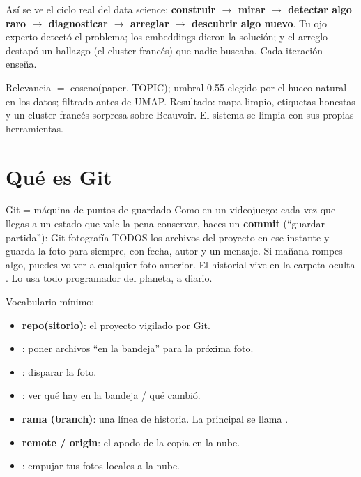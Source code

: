 \documentclass[11pt,a4paper]{article}
\begin{document}
\begin{ojo}
Así se ve el ciclo real del data science: \textbf{construir $\rightarrow$ mirar $\rightarrow$
detectar algo raro $\rightarrow$ diagnosticar $\rightarrow$ arreglar $\rightarrow$ descubrir
algo nuevo}. Tu ojo experto detectó el problema; los embeddings dieron la solución; y el
arreglo destapó un hallazgo (el cluster francés) que nadie buscaba. Cada iteración enseña.
\end{ojo}

\begin{resumen}
Relevancia $=$ coseno(paper, TOPIC); umbral 0.55 elegido por el hueco natural en los datos;
filtrado antes de UMAP. Resultado: mapa limpio, etiquetas honestas y un cluster francés
sorpresa sobre Beauvoir. El sistema se limpia con sus propias herramientas.
\end{resumen}
\clearpage
{}
{}

\section{Qué es Git}

\begin{concepto}{Git = máquina de puntos de guardado}
Como en un videojuego: cada vez que llegas a un estado que vale la pena conservar, haces un
\textbf{commit} (``guardar partida''): Git fotografía TODOS los archivos del proyecto en ese
instante y guarda la foto para siempre, con fecha, autor y un mensaje. Si mañana rompes algo,
puedes volver a cualquier foto anterior. El historial vive en la carpeta oculta .
Lo usa todo programador del planeta, a diario.
\end{concepto}

Vocabulario mínimo:
\begin{itemize}
  \item \textbf{repo(sitorio)}: el proyecto vigilado por Git.
  \item {}: poner archivos ``en la bandeja'' para la próxima foto.
  \item {}: disparar la foto.
  \item {}: ver qué hay en la bandeja / qué cambió.
  \item \textbf{rama (branch)}: una línea de historia. La principal se llama .
  \item \textbf{remote / origin}: el apodo de la copia en la nube.
  \item {}: empujar tus fotos locales a la nube.
\end{itemize}
\end{document}
